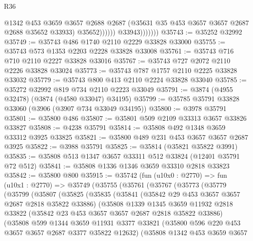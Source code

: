 \begin{lexlean}{R36}
\begin{coremodule}
                              @1342
                              @453
                              @3659
                              @3657
                              @2688
                              @2687
                              (@35631 @35 @453 @3657 @3657 @2687 @2688 @35652 @33933)
                              @35652))))))
                  @33943)))))))
@35743 := @35252 @32992
@35749 := @35743 @486 @1740 @2110 @2229 @33828 @33000
@35755 := @35743 @573 @1353 @2203 @2228 @33828 @33008
@35761 := @35743 @716 @710 @2110 @2227 @33828 @33016
@35767 := @35743 @727 @2072 @2110 @2226 @33828 @33024
@35773 := @35743 @787 @1757 @2110 @2225 @33828 @33032
@35779 := @35743 @800 @413 @2110 @2224 @33828 @33040
@35785 := @35272 @32992 @819 @734 @2110 @2223 @33049
@35791 := @3874 (@4955 @32478) (@3874 (@4580 @33047) @34195)
@35799 := @35785 @35791 @33828 @33060 (@3906 (@3907 @734 @33049 @34195))
@35800 := @3978 @35791
@35801 := @35800 @486
@35807 := @35801 @509 @2109 @33313 @3657 @33826 @33827
@35808 := @4238 @35791
@35814 := @35808 @492 @1348 @3659 @33312 @3925 @33825
@35821 := @35800 @489 @231 @453 @3657 @3657 @2687 @3925
@35822 := @3988 @35791
@35825 := @35814 (@35821 @35822 @3991)
@35835 := @35808 @513 @1347 @3657 @33311 @512 @33824 (@12401 @35791 @72 @512)
@35841 := @35808 @1336 @1346 @3659 @33310 @2818 @33823
@35842 := @35800 @800
@35915 := @35742
    (fun (u10x0 : @2770) =>
    fun (u10x1 : @2770) =>
    @35749
      (@35755
        (@35761
          (@35767
            (@35773
              (@35779
                (@35799
                  (@35807
                    (@35825
                      (@35835
                        (@35841
                          (@35842 @29 @453 @3657 @3657 @2687 @2818 @35822 @33886)
                          (@35808
                            @1339
                            @1345
                            @3659
                            @11932
                            @2818
                            @33822
                            (@35842 @23 @453 @3657 @3657 @2687 @2818 @35822 @33886)
                            (@35808
                              @599
                              @1344
                              @3659
                              @11931
                              @3377
                              @33821
                              (@35800 @596 @220 @453 @3657 @3657 @2687 @3377 @35822 @12632)
                              (@35808
                                @1342
                                @453
                                @3659
                                @3657

\end{coremodule}
\end{lexlean}
